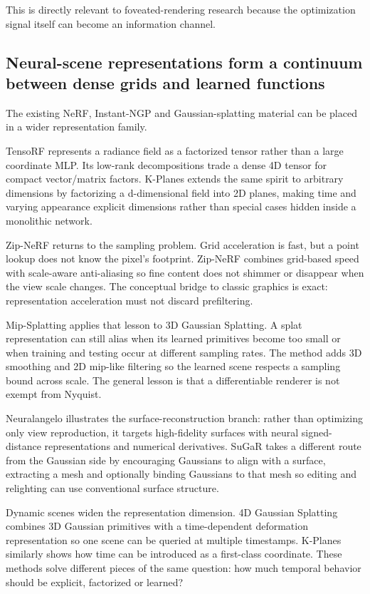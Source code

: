 This is directly relevant to foveated-rendering research because the optimization signal itself can become an information channel.

\subsection{Neural-scene representations form a continuum between dense grids and learned functions}\label{04-visual-computing-ii-ch035-neural-scene-representations-form-a-continuum-between-dense-grids-and-learned-functions}

The existing NeRF, Instant-NGP and Gaussian-splatting material can be placed in a wider representation family.

TensoRF represents a radiance field as a factorized tensor rather than a large coordinate MLP. Its low-rank decompositions trade a dense 4D tensor for compact vector/matrix factors. K-Planes extends the same spirit to arbitrary dimensions by factorizing a d-dimensional field into 2D planes, making time and varying appearance explicit dimensions rather than special cases hidden inside a monolithic network.

Zip-NeRF returns to the sampling problem. Grid acceleration is fast, but a point lookup does not know the pixel's footprint. Zip-NeRF combines grid-based speed with scale-aware anti-aliasing so fine content does not shimmer or disappear when the view scale changes. The conceptual bridge to classic graphics is exact: representation acceleration must not discard prefiltering.

Mip-Splatting applies that lesson to 3D Gaussian Splatting. A splat representation can still alias when its learned primitives become too small or when training and testing occur at different sampling rates. The method adds 3D smoothing and 2D mip-like filtering so the learned scene respects a sampling bound across scale. The general lesson is that a differentiable renderer is not exempt from Nyquist.

Neuralangelo illustrates the surface-reconstruction branch: rather than optimizing only view reproduction, it targets high-fidelity surfaces with neural signed-distance representations and numerical derivatives. SuGaR takes a different route from the Gaussian side by encouraging Gaussians to align with a surface, extracting a mesh and optionally binding Gaussians to that mesh so editing and relighting can use conventional surface structure.

Dynamic scenes widen the representation dimension. 4D Gaussian Splatting combines 3D Gaussian primitives with a time-dependent deformation representation so one scene can be queried at multiple timestamps. K-Planes similarly shows how time can be introduced as a first-class coordinate. These methods solve different pieces of the same question: how much temporal behavior should be explicit, factorized or learned?

